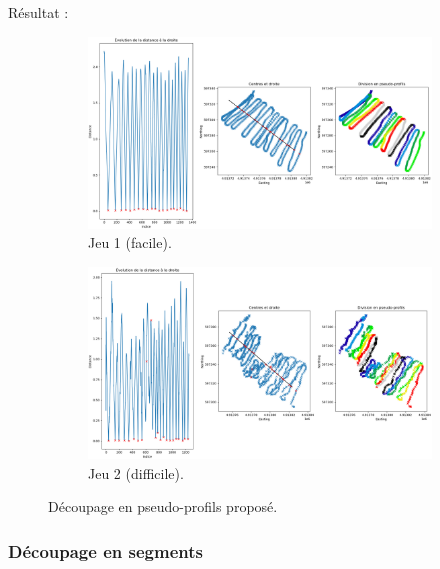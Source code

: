\documentclass[12pt]{article}
\begin{document}
    \newpage
    Résultat :
    \begin{figure}[ht!]
        \centering
        \begin{subfigure}[b]{0.90\textwidth}
            \centering
            \includegraphics[width=\textwidth]{Images/PseudoProf_full_1.png}
            \caption[]%
            {{ \small Jeu 1 (facile).}}    
        \end{subfigure}
        \centering
        \begin{subfigure}[b]{0.90\textwidth}  
            \centering 
            \includegraphics[width=\textwidth]{Images/PseudoProf_full_2.png}
            \caption[]%
            {{\small Jeu 2 (difficile).}}   
            \label{fig:2_pp_2}
        \end{subfigure}
        \caption{Découpage en pseudo-profils proposé.}
    \end{figure}

    \newpage
    \subsubsection{Découpage en segments}
\end{document}
